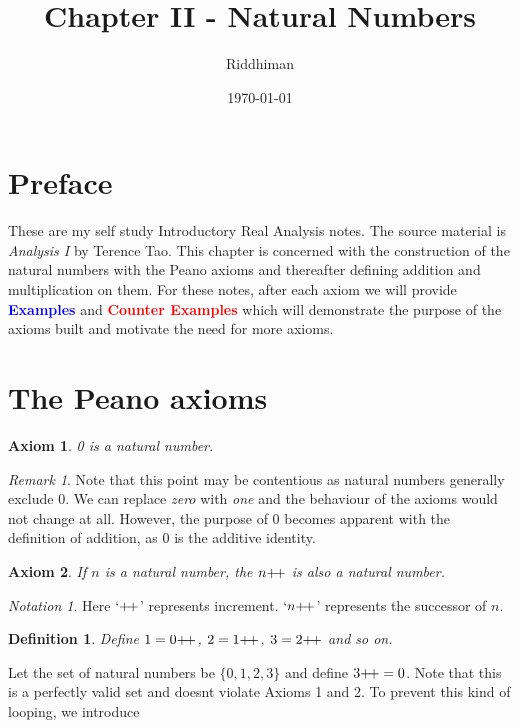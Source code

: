 \documentclass[12pt]{article}
\title{Chapter II - Natural Numbers}
\author{Riddhiman}
\date{\monthyeardate\today}
\newtheorem{axiom}{Axiom}
\newtheorem{definition}{Definition}[section]
\theoremstyle{remark}
\newtheorem*{remark}{Remark}
\newtheorem*{notation}{Notation}
\begin{document}
\def\inc{{\mathrel+\joinrel\mathrel+}}  

\maketitle

\section{Preface}%
\label{sec:Preface}
These are my self study Introductory Real Analysis notes. The source material is \textit{Analysis I} by Terence Tao. This chapter is concerned with the construction of the natural numbers with the Peano axioms and thereafter defining addition and multiplication on them. For these notes, after each axiom we will provide \textcolor{blue}{\textbf{Examples}} and \textcolor{red}{\textbf{Counter Examples}} which will demonstrate the purpose of the axioms built and motivate the need for more axioms.

\section{The Peano axioms}%
\label{sec:The Peano axioms}

\begin{axiom}
   0 is a natural number. 
\end{axiom}

\begin{remark}
    Note that this point may be contentious as natural numbers generally exclude $0$. We can replace \textit{zero} with \textit{one} and the behaviour of the axioms would not change at all. However, the purpose of $0$ becomes apparent with the definition of addition, as $0$ is the additive identity. 
\end{remark}

\begin{axiom}
	If $n$ is a natural number, the $n\inc$ is also a natural number.
\end{axiom}

\begin{notation}
	Here `$\inc$' represents increment. `$n\inc$' represents the successor of $n$. 
\end{notation}

\begin{definition}
   Define $1 = 0\inc$, $2 = 1\inc$, $3 = 2\inc$ and so on.  
\end{definition}


\begin{cexample}
	Let the set of natural numbers be $\{0, 1, 2, 3\}$ and define $3\inc = 0$. Note that this is a perfectly valid set and doesnt violate Axioms 1 and 2. To prevent this kind of looping, we introduce 
\end{cexample}
\end{document}
